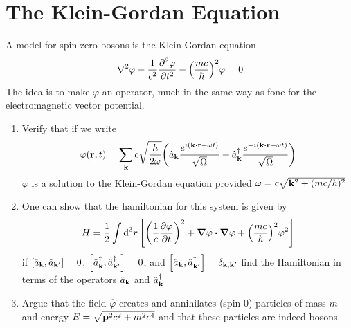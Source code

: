 \documentclass[12pt]{article}
\begin{document}
\section{The Klein-Gordan Equation}
\begin{problem}
  A model for spin zero bosons is the Klein-Gordan equation
  \begin{align*}
    \laplacian{\varphi}-\frac1{c^2}\pdv[2]{\varphi}{t}
    -\qty(\frac{mc}{\hbar})^2\varphi=0
  \end{align*}
  The idea is to make $\varphi$ an operator, much in the same way as fone for the electromagnetic vector potential.
  \begin{enumerate}[label=(\alph*)]
  \item Verify that if we write
    \begin{align*}
      \varphi(\vb{r},t)=\sum_{\vb{k}}c\sqrt{\frac{\hbar}{2\omega}}
      \qty(\hat{a}_{\vb{k}}\frac{e^{i(\vb{k\vdot r}-\omega t)}}{\sqrt{\Omega}}
      +\hat{a}^\dag_{\vb{k}}\frac{e^{-i(\vb{k\vdot r}-\omega t)}}{\sqrt{\Omega}})
    \end{align*}
    $\varphi$ is a solution to the Klein-Gordan equation provided $\omega=c\sqrt{\vb{k}^2+(mc/\hbar)^2}$
  \item One can show that the hamiltonian for this system is given by
    \begin{align*}
      H=\frac12\int\dd[3]{r}\qty[\qty(\frac1c\pdv{\varphi}{t})^2
      +\grad{\varphi}\vdot\grad{\varphi}+\qty(\frac{mc}{\hbar})^2\varphi^2]
    \end{align*}
    if $\comm{\hat{a}_{\vb{k}}}{\hat{a}_{\vb{k}'}}=0$, $\comm{\hat{a}^\dag_{\vb{k}}}{\hat{a}^\dag_{\vb{k}'}}=0$,
    and $\comm{\hat{a}_{\vb{k}}}{\hat{a}^\dag_{\vb{k}'}}=\delta_{\vb{k},\vb{k}'}$ find the Hamiltonian in terms of the operators $\hat{a}_{\vb{k}}$ and $\hat{a}_{\vb{k}}^\dag$
  \item Argue that the field $\hat{\varphi}$ creates and annihilates (spin-0) particles of mass $m$ and energy $E=\sqrt{\vb{p}^2c^2+m^2c^4}$ and that these particles are indeed bosons.
  \end{enumerate}
\end{problem}
\end{document}
